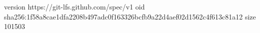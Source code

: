 version https://git-lfs.github.com/spec/v1
oid sha256:1f58a8cae1dfa2208b497adc0f163326bcfb9a22d4aef02d1562c4f613c81a12
size 101503
